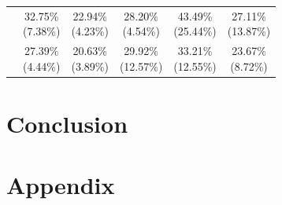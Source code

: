 \documentclass{report}
\begin{document}
\begin{center}
{\begin{tabular}{c|c|c|c|c|c|}
  & \makecell{32.75\% \\ (7.38\%)} & \makecell{22.94\% \\ (4.23\%)} & \cellcolor{light-gray} \makecell{28.20\% \\ (4.54\%)} & \makecell{43.49\% \\ (25.44\%)} & \makecell{27.11\% \\ (13.87\%)} \\ \cline{2-6}
  & \makecell{27.39\% \\ (4.44\%)} & \makecell{20.63\% \\ (3.89\%)} & \makecell{29.92\% \\ (12.57\%)} & \makecell{33.21\% \\ (12.55\%)} & \makecell{23.67\% \\ (8.72\%)} \\ \cline{2-6}
  \end{tabular}
}
\end{center}

\chapter{Conclusion}

\chapter{Appendix}
\end{document}
